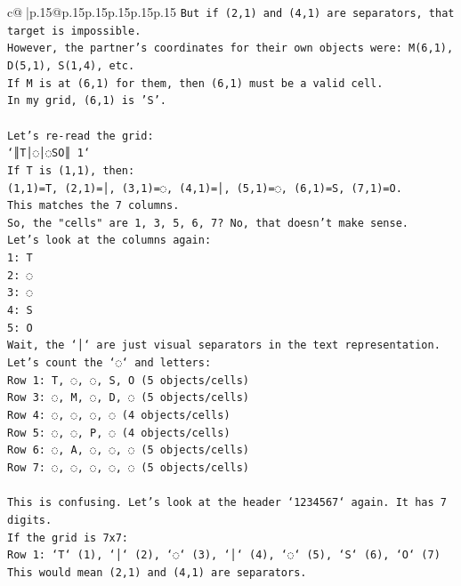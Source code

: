 \documentclass{article}
\begin{document}
{\begin{supertabular}{c@{$\;$}|p{.15\linewidth}@{}p{.15\linewidth}p{.15\linewidth}p{.15\linewidth}p{.15\linewidth}p{.15\linewidth}}
{{{\texttt{But if (2,1) and (4,1) are separators, that target is impossible.} \\
\texttt{However, the partner's coordinates for their own objects were: M(6,1), D(5,1), S(1,4), etc.} \\
\texttt{If M is at (6,1) for them, then (6,1) must be a valid cell.} \\
\texttt{In my grid, (6,1) is 'S'.} \\
\\ 
\texttt{Let's re{-}read the grid:} \\
\texttt{`║T│◌│◌SO║ 1`} \\
\texttt{If T is (1,1), then:} \\
\texttt{(1,1)=T, (2,1)=│, (3,1)=◌, (4,1)=│, (5,1)=◌, (6,1)=S, (7,1)=O.} \\
\texttt{This matches the 7 columns.} \\
\texttt{So, the "cells" are 1, 3, 5, 6, 7? No, that doesn't make sense.} \\
\texttt{Let's look at the columns again:} \\
\texttt{1: T} \\
\texttt{2: ◌} \\
\texttt{3: ◌} \\
\texttt{4: S} \\
\texttt{5: O} \\
\texttt{Wait, the `│` are just visual separators in the text representation.} \\
\texttt{Let's count the `◌` and letters:} \\
\texttt{Row 1: T, ◌, ◌, S, O (5 objects/cells)} \\
\texttt{Row 3: ◌, M, ◌, D, ◌ (5 objects/cells)} \\
\texttt{Row 4: ◌, ◌, ◌, ◌ (4 objects/cells)} \\
\texttt{Row 5: ◌, ◌, P, ◌ (4 objects/cells)} \\
\texttt{Row 6: ◌, A, ◌, ◌, ◌ (5 objects/cells)} \\
\texttt{Row 7: ◌, ◌, ◌, ◌, ◌ (5 objects/cells)} \\
\\ 
\texttt{This is confusing. Let's look at the header `1234567` again. It has 7 digits.} \\
\texttt{If the grid is 7x7:} \\
\texttt{Row 1: `T` (1), `│` (2), `◌` (3), `│` (4), `◌` (5), `S` (6), `O` (7)} \\
\texttt{This would mean (2,1) and (4,1) are separators.} \\
}}}
\end{supertabular}}
\end{document}
